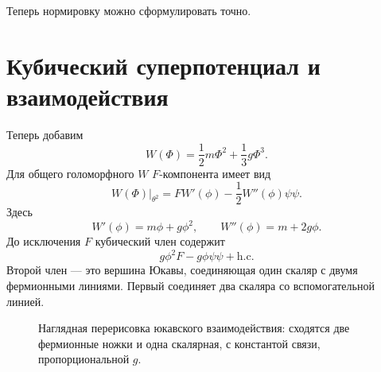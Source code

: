 Теперь нормировку можно сформулировать точно.

\section{Кубический суперпотенциал и взаимодействия}

Теперь добавим
\begin{equation}
W(\Phi)=\frac12m\Phi^2+\frac13g\Phi^3.
\label{eq:l8-superpotential}
\end{equation}
Для общего голоморфного \(W\) \(F\)-компонента имеет вид
\begin{equation}
\left.W(\Phi)\right|_{\theta^2}
=F W'(\phi)-\frac12W''(\phi)\psi\psi.
\label{eq:l8-W-components}
\end{equation}
Здесь
\begin{equation}
W'(\phi)=m\phi+g\phi^2,
\qquad
W''(\phi)=m+2g\phi.
\end{equation}
До исключения \(F\) кубический член содержит
\begin{equation}
g\phi^2F-g\phi\psi\psi+\text{h.c.}
\label{eq:l8-cubic-offshell}
\end{equation}
Второй член — это вершина Юкавы, соединяющая один скаляр с двумя фермионными линиями. Первый соединяет два скаляра со вспомогательной линией.

\begin{figure}[H]
\centering
{}
\caption{Наглядная перерисовка юкавского взаимодействия: сходятся две фермионные ножки и одна скалярная, с константой связи, пропорциональной \(g\).}
\end{figure}


